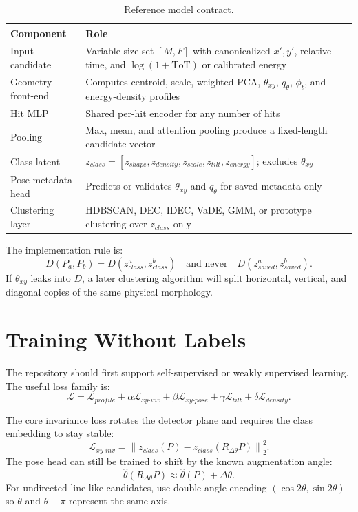 \documentclass[11pt,a4paper]{article}
\newcommand{\thetaxy}{\theta_{xy}}
\newcommand{\phit}{\phi_t}
\begin{document}
\begin{table}[H]
\centering
\caption{Reference model contract.}
\label{tab:model}
\begin{tabularx}{\textwidth}{@{}L{0.29\textwidth}Y@{}}
\toprule
\textbf{Component} & \textbf{Role} \\
\midrule
Input candidate & Variable-size set $[M,F]$ with canonicalized $x',y'$, relative time, and $\log(1+\mathrm{ToT})$ or calibrated energy \\
Geometry front-end & Computes centroid, scale, weighted PCA, $\thetaxy$, $q_\theta$, $\phit$, and energy-density profiles \\
Hit MLP & Shared per-hit encoder for any number of hits \\
Pooling & Max, mean, and attention pooling produce a fixed-length candidate vector \\
Class latent & $z_{class}=[z_{shape},z_{density},z_{scale},z_{tilt},z_{energy}]$; excludes $\thetaxy$ \\
Pose metadata head & Predicts or validates $\thetaxy$ and $q_\theta$ for saved metadata only \\
Clustering layer & HDBSCAN, DEC, IDEC, VaDE, GMM, or prototype clustering over $z_{class}$ only \citep{mcinnes2017hdbscan,xie2016dec,guo2017idec,jiang2017vade} \\
\bottomrule
\end{tabularx}
\end{table}

The implementation rule is:
\[
\boxed{D(P_a,P_b)=D(z^a_{class},z^b_{class}) \quad\text{and never}\quad D(z^a_{saved},z^b_{saved}).}
\]
If $\thetaxy$ leaks into $D$, a later clustering algorithm will split horizontal, vertical, and diagonal copies of the same physical morphology.

\section{Training Without Labels}

The repository should first support self-supervised or weakly supervised learning. The useful loss family is:
\[
\mathcal{L}=\mathcal{L}_{profile}
+\alpha\mathcal{L}_{xy\text{-}inv}
+\beta\mathcal{L}_{xy\text{-}pose}
+\gamma\mathcal{L}_{tilt}
+\delta\mathcal{L}_{density}.
\]

The core invariance loss rotates the detector plane and requires the class embedding to stay stable:
\[
\mathcal{L}_{xy\text{-}inv}=\left\|z_{class}(P)-z_{class}(R_{\Delta\theta}P)\right\|_2^2.
\]
The pose head can still be trained to shift by the known augmentation angle:
\[
\hat{\theta}(R_{\Delta\theta}P)\approx \hat{\theta}(P)+\Delta\theta.
\]
For undirected line-like candidates, use double-angle encoding $(\cos 2\theta,\sin 2\theta)$ so $\theta$ and $\theta+\pi$ represent the same axis.
\end{document}
